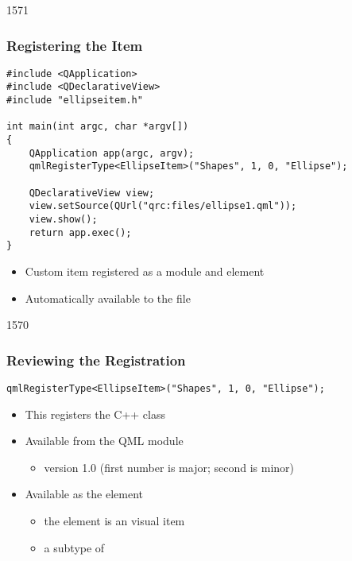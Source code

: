 \begin{slide}[fragile]{1571}\frametitle{Registering the Item}

\begin{lstlisting}
#include <QApplication>
#include <QDeclarativeView>
#include "ellipseitem.h"

int main(int argc, char *argv[])
{
    QApplication app(argc, argv);
    qmlRegisterType<EllipseItem>("Shapes", 1, 0, "Ellipse");

    QDeclarativeView view;
    view.setSource(QUrl("qrc:files/ellipse1.qml"));
    view.show();
    return app.exec();
}
\end{lstlisting}

\begin{itemize}
\item Custom item registered as a module and element
\item Automatically available to the  file
\end{itemize}

\end{slide}

\begin{slide}[fragile]{1570}\frametitle{Reviewing the Registration}

\medskip
\begin{lstlisting}
qmlRegisterType<EllipseItem>("Shapes", 1, 0, "Ellipse");
\end{lstlisting}

\medskip
\medskip

\begin{itemize}
\item  This registers the  C++ class
\medskip
\item Available from the  QML module
  \begin{itemize}
  \item version 1.0 (first number is major; second is minor)
  \end{itemize}
\item Available as the  element
  \begin{itemize}
  \item the  element is an visual item
  \item a subtype of 
  \end{itemize}
\end{itemize}

\end{slide}

